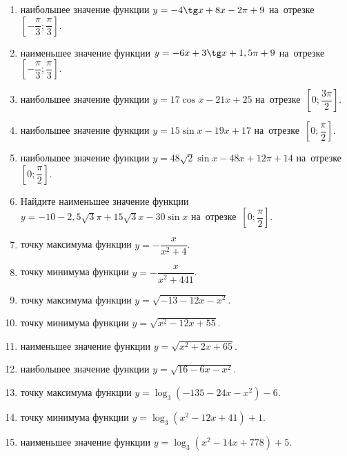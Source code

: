 \documentclass[a4paper,10pt]{article}
\begin{document}
\begin{enumerate}
\item {} наибольшее значение функции $y=-4\tg x +8x-2\pi +9$ на~отрезке~$\left[-\dfrac{\pi}{3};\dfrac{\pi}{3}\right]$.

\item {} наименьшее значение функции $y=-6x +3\tg x+1,5\pi+9$ на~отрезке~$\left[-\dfrac{\pi}{3};\dfrac{\pi}{3}\right]$.

\item {} наибольшее значение функции $y=17\cos x-21x+25$ на~отрезке~$\left[0;\dfrac{3\pi}{2}\right]$.

\item {} наибольшее значение функции $y=15\sin x-19x+17$ на~отрезке~$\left[0;\dfrac{\pi}{2}\right]$.

\item {} наибольшее значение функции $y=48\sqrt{2}\sin x-48x+12\pi +14$ на~отрезке~$\left[0;\dfrac{\pi}{2}\right]$.

\item Найдите наименьшее значение функции $y=-10-2,5\sqrt{3}\pi+15\sqrt{3}x-30\sin x$ на~отрезке~$\left[0;\dfrac{\pi}{2}\right]$.

\item {} точку максимума функции $y=-\dfrac{x}{ x^2 +4}$.

\item {} точку минимума функции $y=-\dfrac{x}{ x^2 +441}$.

\item {} точку максимума функции $y=\sqrt{-13-12x-x^2}$.

\item {} точку минимума функции $y=\sqrt{x^2-12x+55}$.

\item {} наименьшее значение функции $y=\sqrt{x^2+2x+65}$.

\item {} наибольшее значение функции $y=\sqrt{16-6x-x^2}$.

\item {} точку максимума функции $y=\log_3\left(-135-24x-x^2\right)-6$.

\item {} точку минимума функции $y=\log_3\left(x^2-12x+41\right)+1$.

\item {} наименьшее значение функции $y=\log_3\left(x^2-14x+778\right)+5$.


\end{enumerate}
\end{document}
